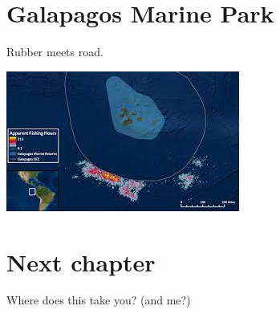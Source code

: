 \documentclass[
]{book}
\begin{document}
\hypertarget{galapagos-marine-park}{%
\chapter{Galapagos Marine Park}\label{galapagos-marine-park}}

Rubber meets road.

\begin{center}\includegraphics[width=1\linewidth]{_images/chinese} \end{center}

\hypertarget{next-chapter}{%
\chapter{Next chapter}\label{next-chapter}}

Where does this take you? (and me?)

  
\end{document}
